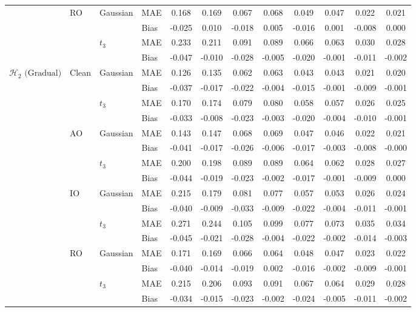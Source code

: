 \begin{table}[ht]
{\begin{tabular}{clllcc|cc|cc|cc}
\cmidrule{2-12}
& \multirow{4}{*}{RO} & \multirow{2}{*}{Gaussian} & MAE & 0.168 & 0.169 & 0.067 & 0.068 & 0.049 & 0.047 & 0.022 & 0.021 \\
& & & Bias & -0.025 & 0.010 & -0.018 & 0.005 & -0.016 & 0.001 & -0.008 & 0.000 \\
\cmidrule{3-12}
& & \multirow{2}{*}{$t_3$} & MAE & 0.233 & 0.211 & 0.091 & 0.089 & 0.066 & 0.063 & 0.030 & 0.028 \\
& & & Bias & -0.047 & -0.010 & -0.028 & -0.005 & -0.020 & -0.001 & -0.011 & -0.002 \\
\midrule
\multirow{16}{*}{$\mathcal{H}_2 \text{ (Gradual)}$}
& \multirow{4}{*}{Clean} & \multirow{2}{*}{Gaussian} & MAE & 0.126 & 0.135 & 0.062 & 0.063 & 0.043 & 0.043 & 0.021 & 0.020 \\
& & & Bias & -0.037 & -0.017 & -0.022 & -0.004 & -0.015 & -0.001 & -0.009 & -0.001 \\
\cmidrule{3-12}
& & \multirow{2}{*}{$t_3$} & MAE & 0.170 & 0.174 & 0.079 & 0.080 & 0.058 & 0.057 & 0.026 & 0.025 \\
& & & Bias & -0.033 & -0.008 & -0.023 & -0.003 & -0.020 & -0.004 & -0.010 & -0.001 \\
\cmidrule{2-12}
& \multirow{4}{*}{AO} & \multirow{2}{*}{Gaussian} & MAE & 0.143 & 0.147 & 0.068 & 0.069 & 0.047 & 0.046 & 0.022 & 0.021 \\
& & & Bias & -0.041 & -0.017 & -0.026 & -0.006 & -0.017 & -0.003 & -0.008 & -0.000 \\
\cmidrule{3-12}
& & \multirow{2}{*}{$t_3$} & MAE & 0.200 & 0.198 & 0.089 & 0.089 & 0.064 & 0.062 & 0.028 & 0.027 \\
& & & Bias & -0.044 & -0.019 & -0.023 & -0.002 & -0.017 & -0.001 & -0.009 & 0.000 \\
\cmidrule{2-12}
& \multirow{4}{*}{IO} & \multirow{2}{*}{Gaussian} & MAE & 0.215 & 0.179 & 0.081 & 0.077 & 0.057 & 0.053 & 0.026 & 0.024 \\
& & & Bias & -0.040 & -0.009 & -0.033 & -0.009 & -0.022 & -0.004 & -0.011 & -0.001 \\
\cmidrule{3-12}
& & \multirow{2}{*}{$t_3$} & MAE & 0.271 & 0.244 & 0.105 & 0.099 & 0.077 & 0.073 & 0.035 & 0.034 \\
& & & Bias & -0.045 & -0.021 & -0.028 & -0.004 & -0.022 & -0.002 & -0.014 & -0.003 \\
\cmidrule{2-12}
& \multirow{4}{*}{RO} & \multirow{2}{*}{Gaussian} & MAE & 0.171 & 0.169 & 0.066 & 0.064 & 0.048 & 0.047 & 0.023 & 0.022 \\
& & & Bias & -0.040 & -0.014 & -0.019 & 0.002 & -0.016 & -0.002 & -0.009 & -0.001 \\
\cmidrule{3-12}
& & \multirow{2}{*}{$t_3$} & MAE & 0.215 & 0.206 & 0.093 & 0.091 & 0.067 & 0.064 & 0.029 & 0.028 \\
& & & Bias & -0.034 & -0.015 & -0.023 & -0.002 & -0.024 & -0.005 & -0.011 & -0.002 \\
\bottomrule
\end{tabular}
}
\end{table}
